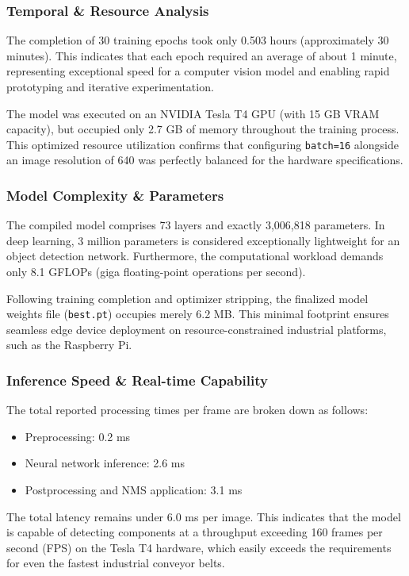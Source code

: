 \documentclass{article}
\begin{document}
\subsubsection{Temporal \& Resource Analysis}

The completion of 30 training epochs took only 0.503 hours (approximately 30 minutes). This indicates that each epoch required an average of about 1 minute, representing exceptional speed for a computer vision model and enabling rapid prototyping and iterative experimentation.

The model was executed on an NVIDIA Tesla T4 GPU (with 15 GB VRAM capacity), but occupied only 2.7 GB of memory throughout the training process. This optimized resource utilization confirms that configuring \texttt{batch=16} alongside an image resolution of 640 was perfectly balanced for the hardware specifications.

\subsubsection{Model Complexity \& Parameters}

The compiled model comprises 73 layers and exactly 3,006,818 parameters. In deep learning, 3 million parameters is considered exceptionally lightweight for an object detection network. Furthermore, the computational workload demands only 8.1 GFLOPs (giga floating-point operations per second).

Following training completion and optimizer stripping, the finalized model weights file (\texttt{best.pt}) occupies merely 6.2 MB. This minimal footprint ensures seamless edge device deployment on resource-constrained industrial platforms, such as the Raspberry Pi.


\subsubsection{Inference Speed \& Real-time Capability}

The total reported processing times per frame are broken down as follows:
\begin{itemize}
	\item Preprocessing: 0.2 ms
	\item Neural network inference: 2.6 ms
	\item Postprocessing and NMS application: 3.1 ms
\end{itemize}

The total latency remains under 6.0 ms per image. This indicates that the model is capable of detecting components at a throughput exceeding 160 frames per second (FPS) on the Tesla T4 hardware, which easily exceeds the requirements for even the fastest industrial conveyor belts.
\end{document}
